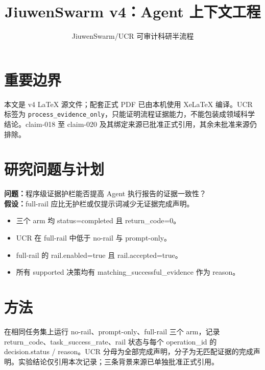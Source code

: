 \documentclass[UTF8]{ctexart}
\title{JiuwenSwarm v4：Agent 上下文工程}
\author{JiuwenSwarm/UCR 可审计科研半流程}
\date{}
\begin{document}
\maketitle
\section{重要边界}
本文是 v4 LaTeX 源文件；配套正式 PDF 已由本机使用 XeLaTeX 编译。UCR 标签为 \texttt{process\_evidence\_only}，只能证明流程证据能力，不能包装成领域科学结论。claim-018 至 claim-020 及其绑定来源已批准正式引用，其余未批准来源仍排除。
\section{研究问题与计划}
\textbf{问题：}程序级证据护栏能否提高 Agent 执行报告的证据一致性？\\
\textbf{假设：}full-\allowbreak{}rail 应比无护栏或仅提示词减少无证据完成声明。
\begin{itemize}
\item 三个 arm 均 status=completed 且 return\_\allowbreak{}code=0。
\item UCR 在 full-\allowbreak{}rail 中低于 no-\allowbreak{}rail 与 prompt-\allowbreak{}only。
\item full-\allowbreak{}rail 的 rail.enabled=true 且 rail.accepted=true。
\item 所有 supported 决策均有 matching\_\allowbreak{}successful\_\allowbreak{}evidence 作为 reason。
\end{itemize}
\section{方法}
在相同任务集上运行 no-\allowbreak{}rail、prompt-\allowbreak{}only、full-\allowbreak{}rail 三个 arm，记录 return\_\allowbreak{}code、task\_\allowbreak{}success\_\allowbreak{}rate、rail 状态与每个 operation\_\allowbreak{}id 的 decision.status / reason。UCR 分母为全部完成声明，分子为无匹配证据的完成声明。实验结论仅引用本次记录；三条背景来源已单独批准正式引用。
\end{document}
